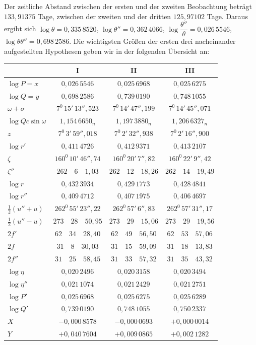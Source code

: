 Der zeitliche Abstand zwischen der ersten und der zweiten Beobachtung beträgt
$133{,}91375$ Tage, zwischen der zweiten und der dritten $125{,}97102$ Tage. Daraus ergibt sich $\log\theta = 0{,}335\,8520$,
$\log\theta'' = 0{,}362\,4066$, $\log\dfrac{\theta''}{\theta} = 0{,}026\,5546$, $\log\theta\theta'' = 0{,}698\,2586$. Die wichtigsten Größen der ersten drei nacheinander
aufgestellten Hypothesen geben wir in der folgenden Übersicht an:
\begin{center}\begingroup\footnotesize\setlength{\tabcolsep}{3pt}\renewcommand{\arraystretch}{1.3}
\begin{tabular}{l|c|c|c}
 & I & II & III \\
\hline
$\log P = x$ & $0{,}026\,5546$ & $0{,}025\,6968$ & $0{,}025\,6275$ \\
$\log Q = y$ & $0{,}698\,2586$ & $0{,}739\,0190$ & $0{,}748\,1055$ \\
$\omega + \sigma$ & $7^0\,15'\,13''{,}523$ & $7^0\,14'\,47''{,}199$ & $7^0\,14'\,45''{,}071$ \\
$\log Qc\sin\omega$ & $1{,}154\,6650_n$ & $1{,}197\,3880_n$ & $1{,}206\,6327_n$ \\
$z$ & $7^0\,3'\,59''{,}018$ & $7^0\,2'\,32''{,}938$ & $7^0\,2'\,16''{,}900$ \\
$\log r'$ & $0{,}411\,4726$ & $0{,}412\,9371$ & $0{,}413\,2107$ \\
$\zeta$ & $160^0\,10'\,46''{,}74$ & $160^0\,20'\,7''{,}82$ & $160^0\,22'\,9''{,}42$ \\
$\zeta''$ & $262\quad6\quad1{,}03$ & $262\quad12\quad18{,}26$ & $262\quad14\quad19{,}49$ \\
$\log r$ & $0{,}432\,3934$ & $0{,}429\,1773$ & $0{,}428\,4841$ \\
$\log r''$ & $0{,}409\,4712$ & $0{,}407\,1975$ & $0{,}406\,4697$ \\
$\tfrac12(u''+u)$ & $262^0\,55'\,23''{,}22$ & $262^0\,57'\,6''{,}83$ & $262^0\,57'\,31''{,}17$ \\
$\tfrac12(u''-u)$ & $273\quad28\quad50{,}95$ & $273\quad29\quad15{,}06$ & $273\quad29\quad19{,}56$ \\
$2f'$ & $62\quad34\quad28{,}40$ & $62\quad49\quad56{,}50$ & $62\quad53\quad57{,}06$ \\
$2f$ & $31\quad8\quad30{,}03$ & $31\quad15\quad59{,}09$ & $31\quad18\quad13{,}83$ \\
$2f''$ & $31\quad25\quad58{,}45$ & $31\quad33\quad57{,}32$ & $31\quad35\quad43{,}32$ \\
$\log \eta$ & $0{,}020\,2496$ & $0{,}020\,3158$ & $0{,}020\,3494$ \\
$\log \eta''$ & $0{,}021\,1074$ & $0{,}021\,2429$ & $0{,}021\,2751$ \\
$\log P'$ & $0{,}025\,6968$ & $0{,}025\,6275$ & $0{,}025\,6289$ \\
$\log Q'$ & $0{,}739\,0190$ & $0{,}748\,1055$ & $0{,}750\,2337$ \\
$X$ & $-0{,}000\,8578$ & $-0{,}000\,0693$ & $+0{,}000\,0014$ \\
$Y$ & $+0{,}040\,7604$ & $+0{,}009\,0865$ & $+0{,}002\,1282$ \\
\end{tabular}
\endgroup\end{center}

